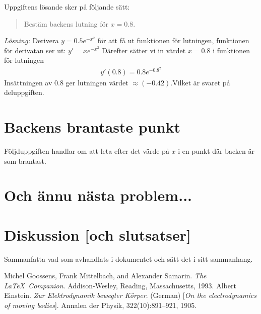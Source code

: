 \documentclass[a4paper,12pt]{article}
\begin{document}
Uppgiftens lösande sker på följande sätt:
\begin{quote} 
  Bestäm backens lutning för $x = 0.8$.
\end{quote}
%
\emph{Lösning:} Derivera $y=0.5e^{-x^2}$ för att få ut funktionen för lutningen, funktionen för derivatan ser ut: $y'=xe^{-x^2}$
%
Därefter sätter vi in värdet $x=0.8$ i funktionen för lutningen
%
\begin{align*}
	y'(0.8)=0.8e^{-0.8^2}
\end{align*}
Insättningen av $0.8$ ger lutningen värdet $\approx(-0.42)$.Vilket är svaret på deluppgiften. 
%
%
%
%
\section{Backens brantaste punkt}
\label{sec:uppg2}


Följduppgiften handlar om att leta efter det värde på $x$ i en punkt där backen är som brantast.
\section{Och ännu nästa problem...}
\label{sec:uppgN}


\section{Diskussion [och slutsatser]}
\label{sec:disk}


Sammanfatta vad som avhandlats i dokumentet och sätt det i
sitt sammanhang.
%
\begin{thebibliography}{99}
%
Michel Goossens, Frank Mittelbach, and Alexander Samarin. 
\textit{The \LaTeX\ Companion}. 
Addison-Wesley, Reading, Massachusetts, 1993.
%
Albert Einstein. 
\textit{Zur Elektrodynamik bewegter K{\"o}rper}. (German) 
[\textit{On the electrodynamics of moving bodies}]. 
Annalen der Physik, 322(10):891–921, 1905.
%
\end{thebibliography}
%
\end{document}
